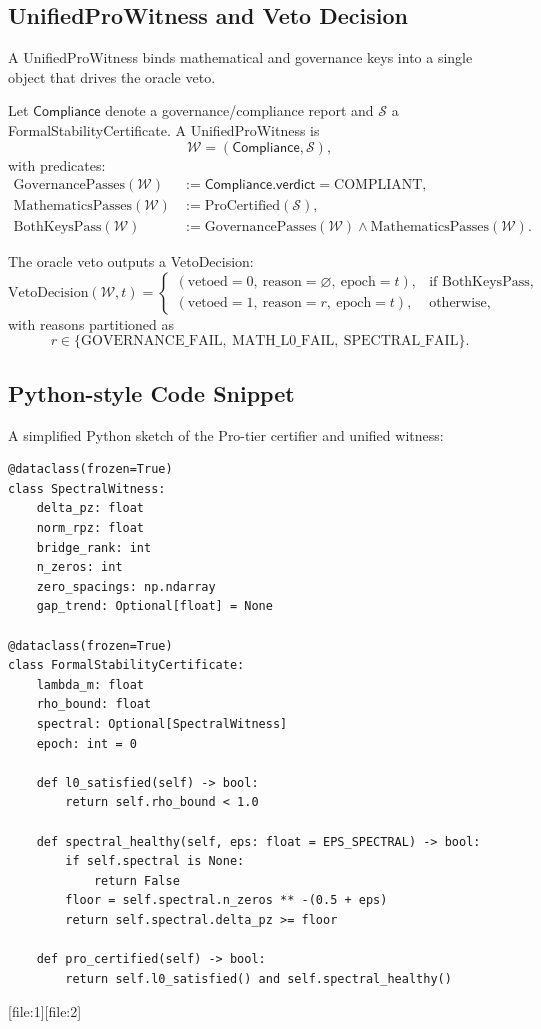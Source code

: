 \documentclass[11pt]{article}
\begin{document}
\subsection{UnifiedProWitness and Veto Decision}

A UnifiedProWitness binds mathematical and governance keys into a single
object that drives the oracle veto.

\begin{definition}[UnifiedProWitness]
Let $\mathsf{Compliance}$ denote a governance/compliance report and
$\mathcal{S}$ a FormalStabilityCertificate. A UnifiedProWitness is
\[
  \mathcal{W} = (\mathsf{Compliance}, \mathcal{S}),
\]
with predicates:
\begin{align*}
  \mathrm{GovernancePasses}(\mathcal{W})
  &:= \mathsf{Compliance.verdict} = \text{COMPLIANT},\\
  \mathrm{MathematicsPasses}(\mathcal{W})
  &:= \mathrm{ProCertified}(\mathcal{S}),\\
  \mathrm{BothKeysPass}(\mathcal{W})
  &:= \mathrm{GovernancePasses}(\mathcal{W}) \wedge
      \mathrm{MathematicsPasses}(\mathcal{W}).
\end{align*}
\end{definition}

The oracle veto outputs a VetoDecision:
\[
  \mathrm{VetoDecision}(\mathcal{W}, t)
  =
  \begin{cases}
    (\mathrm{vetoed} = 0,\ \mathrm{reason} = \varnothing,\ \mathrm{epoch} = t),
      & \text{if BothKeysPass},\\
    (\mathrm{vetoed} = 1,\ \mathrm{reason} = r,\ \mathrm{epoch} = t),
      & \text{otherwise},
  \end{cases}
\]
with reasons partitioned as
\[
  r \in \{\text{GOVERNANCE\_FAIL},\ \text{MATH\_L0\_FAIL},\ \text{SPECTRAL\_FAIL}\}.
\]

\subsection{Python-style Code Snippet}

A simplified Python sketch of the Pro-tier certifier and unified witness:

\begin{verbatim}
@dataclass(frozen=True)
class SpectralWitness:
    delta_pz: float
    norm_rpz: float
    bridge_rank: int
    n_zeros: int
    zero_spacings: np.ndarray
    gap_trend: Optional[float] = None

@dataclass(frozen=True)
class FormalStabilityCertificate:
    lambda_m: float
    rho_bound: float
    spectral: Optional[SpectralWitness]
    epoch: int = 0

    def l0_satisfied(self) -> bool:
        return self.rho_bound < 1.0

    def spectral_healthy(self, eps: float = EPS_SPECTRAL) -> bool:
        if self.spectral is None:
            return False
        floor = self.spectral.n_zeros ** -(0.5 + eps)
        return self.spectral.delta_pz >= floor

    def pro_certified(self) -> bool:
        return self.l0_satisfied() and self.spectral_healthy()
\end{verbatim}%
[file:1][file:2]
\end{document}
